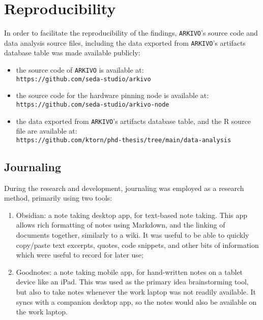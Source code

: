 \section{Reproducibility}

In order to facilitate the reproducibility of the findings, \texttt{ARKIVO}'s source code and data analysis source files, including the data exported from \texttt{ARKIVO}'s artifacts database table was made available publicly:

\begin{itemize}
    \item the source code of \texttt{ARKIVO} is available at:\\ \texttt{https://github.com/seda-studio/arkivo}
    \item the source code for the hardware pinning node is available at:\\ \texttt{https://github.com/seda-studio/arkivo-node}
    \item the data exported from \texttt{ARKIVO}'s artifacts database table, and the R source file are available at: \\ \texttt{https://github.com/ktorn/phd-thesis/tree/main/data-analysis}
\end{itemize}

\subsection{Journaling}

During the research and development, journaling was employed as a research method, primarily using two tools:

\begin{enumerate}
    \item Obsidian\footnotemark[1]: a note taking desktop app, for text-based note taking. This app allows rich formatting of notes using Markdown, and the linking of documents together, similarly to a wiki. It was useful to be able to quickly copy/paste text excerpts, quotes, code snippets, and other bits of information which were useful to record for later use;
    \item Goodnotes\footnotemark[2]: a note taking mobile app, for hand-written notes on a tablet device like an iPad. This was used as the primary idea brainstorming tool, but also to take notes whenever the work laptop was not readily available. It syncs with a companion desktop app, so the notes would also be available on the work laptop.
\end{enumerate}

